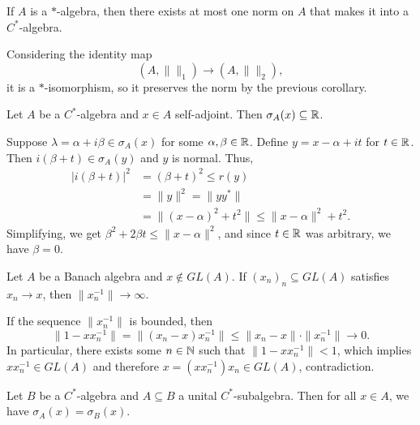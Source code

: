 \begin{corollary}
  If $A$ is a $*$-algebra, then there exists at most one norm on $A$
  that makes it into a $C^*$-algebra.
\end{corollary}

\begin{myproof}
  Considering the identity map 
  $$(A, \|\|_1) \rightarrow (A, \|\|_2),$$
  it is a $*$-isomorphism, so it preserves the norm by the previous corollary.
\end{myproof}

\begin{lemma}
  Let $A$ be a $C^*$-algebra and $x \in A$ self-adjoint. Then $\sigma_A (x) \subseteq \mathbb {R}$.
\end{lemma}

\begin{myproof}
  Suppose $\lambda = \alpha + i \beta \in \sigma_A (x)$ for some $\alpha, \beta \in \mathbb {R}$.
  Define $y = x - \alpha + it$ for $t \in \mathbb {R}$. Then $i(\beta + t) \in \sigma_A (y)$ and $y$ is normal.
  Thus, 
  \begin{align*}
    |i(\beta + t)|^2 &= (\beta + t)^2 \leq r(y)\\
    &= \|y\|^2 = \|yy^*\|\\
    &= \| (x - \alpha)^2 + t^2\| \leq \|x - \alpha\|^2 + t^2.
  \end{align*}
  Simplifying, we get $\beta^2 + 2 \beta t \leq \| x - \alpha\|^2$, and since $t \in \mathbb {R}$ was arbitrary, we have $\beta = 0$.
\end{myproof}

\begin{lemma}
  Let $A$ be a Banach algebra and $x \notin GL(A)$.
  If $(x_n)_n \subseteq GL(A)$ satisfies $x_n \to x$, then $\|x_n ^{-1}\| \to \infty$.
\end{lemma}

\begin{myproof}
  If the sequence $\|x_n^{-1}\|$ is bounded, then 
  $$\| 1 - x x_n^{-1}\| = \| (x_n - x) x_n^{-1}\| \leq \| x_n - x\| \cdot \|x_n^{-1}\| \to 0.$$
  In particular, there exists some $n \in \mathbb {N}$ such that $\| 1 - xx_n^{-1}\| < 1$,
  which implies $x x_n^{-1} \in GL (A)$ and therefore $x = (x x_n^{-1}) x_n \in GL(A)$, contradiction.
\end{myproof}

\begin{proposition}
  Let $B$ be a $C^*$-algebra and $A \subseteq B$ a unital $C^*$-subalgebra.
  Then for all $x \in A$, we have $\sigma_A (x) = \sigma_B (x)$.
\end{proposition}

